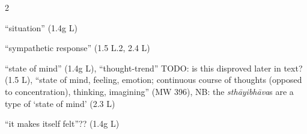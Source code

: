 \documentclass[10pt]{article}
\begin{document}
\begin{multicols}{2}
\begin{enumerate}[
			leftmargin=0em,
			rightmargin=0em,
		]
		 ``situation'' (1.4g L)



		 ``sympathetic response'' (1.5 L.2, 2.4 L)


		 ``state of mind'' (1.4g L),
		``thought-trend'' TODO: is this disproved later in text? (1.5 L), %
		``state of mind, feeling, emotion; continuous course of thoughts (opposed to concentration), thinking, imagining'' (MW 396),
		NB: the \textit{sthāyibhāva}s are a type of `state of mind' (2.3 L)

		 ``it makes itself felt''?? (1.4g L)


\end{enumerate}
\end{multicols}
\end{document}
